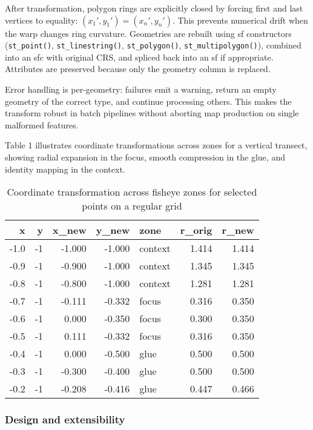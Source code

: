 After transformation, polygon rings are explicitly closed by forcing first and last vertices to equality: \((x_1', y_1') = (x_n', y_n')\). This prevents numerical drift when the warp changes ring curvature. Geometries are rebuilt using sf constructors (\texttt{st\_point()}, \texttt{st\_linestring()}, \texttt{st\_polygon()}, \texttt{st\_multipolygon()}), combined into an sfc with original CRS, and spliced back into an sf if appropriate. Attributes are preserved because only the geometry column is replaced.

Error handling is per-geometry: failures emit a warning, return an empty geometry of the correct type, and continue processing others. This makes the transform robust in batch pipelines without aborting map production on single malformed features.

Table 1 illustrates coordinate transformations across zones for a vertical transect, showing radial expansion in the focus, smooth compression in the glue, and identity mapping in the context.

\begin{table}

\caption{\label{tab:transformation-table}Coordinate transformation across fisheye zones for selected points on a regular grid}
\centering
\begin{tabular}[t]{r|r|r|r|l|r|r}
\hline
x & y & x\_new & y\_new & zone & r\_orig & r\_new\\
\hline
-1.0 & -1 & -1.000 & -1.000 & context & 1.414 & 1.414\\
\hline
-0.9 & -1 & -0.900 & -1.000 & context & 1.345 & 1.345\\
\hline
-0.8 & -1 & -0.800 & -1.000 & context & 1.281 & 1.281\\
\hline
-0.7 & -1 & -0.111 & -0.332 & focus & 0.316 & 0.350\\
\hline
-0.6 & -1 & 0.000 & -0.350 & focus & 0.300 & 0.350\\
\hline
-0.5 & -1 & 0.111 & -0.332 & focus & 0.316 & 0.350\\
\hline
-0.4 & -1 & 0.000 & -0.500 & glue & 0.500 & 0.500\\
\hline
-0.3 & -1 & -0.300 & -0.400 & glue & 0.500 & 0.500\\
\hline
-0.2 & -1 & -0.208 & -0.416 & glue & 0.447 & 0.466\\
\hline
\end{tabular}
\end{table}

\subsubsection{Design and extensibility}\label{design-and-extensibility}

